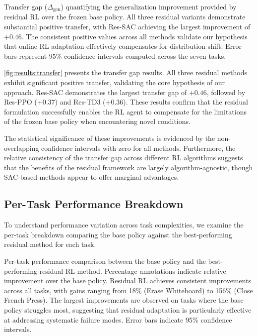 {Transfer gap ($\Delta_{\text{gen}}$) quantifying the generalization improvement provided by residual \ac{RL} over the frozen base policy. All three residual variants demonstrate substantial positive transfer, with Res-SAC achieving the largest improvement of $+0.46$. The consistent positive values across all methods validate our hypothesis that online \ac{RL} adaptation effectively compensates for distribution shift. Error bars represent 95\% confidence intervals computed across the seven tasks.}

\autoref{fig:results:transfer} presents the transfer gap results. All three residual methods exhibit significant positive transfer, validating the core hypothesis of our approach. Res-SAC demonstrates the largest transfer gap of $+0.46$, followed by Res-PPO ($+0.37$) and Res-TD3 ($+0.36$). These results confirm that the residual formulation successfully enables the \ac{RL} agent to compensate for the limitations of the frozen base policy when encountering novel conditions.

The statistical significance of these improvements is evidenced by the non-overlapping confidence intervals with zero for all methods. Furthermore, the relative consistency of the transfer gap across different \ac{RL} algorithms suggests that the benefits of the residual framework are largely algorithm-agnostic, though SAC-based methods appear to offer marginal advantages.

\subsection{Per-Task Performance Breakdown}
\label{sec:results:pertask}

To understand performance variation across task complexities, we examine the per-task breakdown comparing the base policy against the best-performing residual method for each task.

{Per-task performance comparison between the base policy and the best-performing residual \ac{RL} method. Percentage annotations indicate relative improvement over the base policy. Residual \ac{RL} achieves consistent improvements across all tasks, with gains ranging from 18\% (Erase Whiteboard) to 156\% (Close French Press). The largest improvements are observed on tasks where the base policy struggles most, suggesting that residual adaptation is particularly effective at addressing systematic failure modes. Error bars indicate 95\% confidence intervals.}

